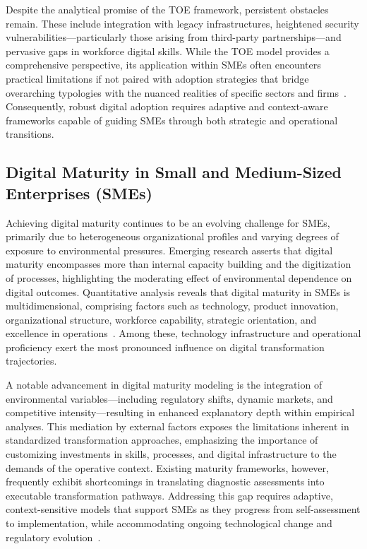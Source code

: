 \documentclass[sigconf]{acmart}
\begin{document}
Despite the analytical promise of the TOE framework, persistent obstacles remain. These include integration with legacy infrastructures, heightened security vulnerabilities—particularly those arising from third-party partnerships—and pervasive gaps in workforce digital skills. While the TOE model provides a comprehensive perspective, its application within SMEs often encounters practical limitations if not paired with adoption strategies that bridge overarching typologies with the nuanced realities of specific sectors and firms~\cite{ref89}. Consequently, robust digital adoption requires adaptive and context-aware frameworks capable of guiding SMEs through both strategic and operational transitions.

\subsection{Digital Maturity in Small and Medium-Sized Enterprises (SMEs)}

Achieving digital maturity continues to be an evolving challenge for SMEs, primarily due to heterogeneous organizational profiles and varying degrees of exposure to environmental pressures. Emerging research asserts that digital maturity encompasses more than internal capacity building and the digitization of processes, highlighting the moderating effect of environmental dependence on digital outcomes. Quantitative analysis reveals that digital maturity in SMEs is multidimensional, comprising factors such as technology, product innovation, organizational structure, workforce capability, strategic orientation, and excellence in operations~\cite{ref34}. Among these, technology infrastructure and operational proficiency exert the most pronounced influence on digital transformation trajectories.

A notable advancement in digital maturity modeling is the integration of environmental variables—including regulatory shifts, dynamic markets, and competitive intensity—resulting in enhanced explanatory depth within empirical analyses. This mediation by external factors exposes the limitations inherent in standardized transformation approaches, emphasizing the importance of customizing investments in skills, processes, and digital infrastructure to the demands of the operative context. Existing maturity frameworks, however, frequently exhibit shortcomings in translating diagnostic assessments into executable transformation pathways. Addressing this gap requires adaptive, context-sensitive models that support SMEs as they progress from self-assessment to implementation, while accommodating ongoing technological change and regulatory evolution~\cite{ref34}.
\end{document}

